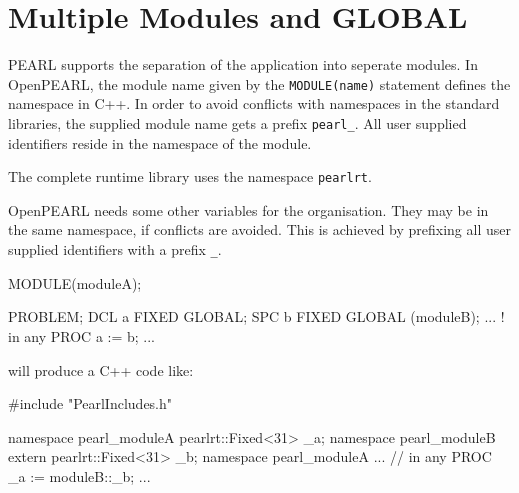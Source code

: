 \chapter{Multiple Modules and GLOBAL}

PEARL supports the separation of the application into seperate modules.
In OpenPEARL, the module name given by the \texttt{MODULE(name)} statement
defines the namespace in C++.
In order to avoid conflicts with namespaces in the standard libraries,
the supplied module name gets a prefix \texttt{pearl\_}.
All user supplied identifiers reside in the namespace of the module.

The complete runtime library uses the namespace \texttt{pearlrt}.

OpenPEARL needs some other variables for the organisation. 
They may be in the same namespace, if conflicts are avoided. This is 
achieved by prefixing all user supplied identifiers with a prefix \texttt{\_}.

\begin{PEARLCode}
MODULE(moduleA);

PROBLEM;
   DCL  a FIXED GLOBAL;
   SPC b FIXED GLOBAL (moduleB);
...
! in any PROC
   a := b;
...
\end{PEARLCode}

will produce a C++ code like:
\begin{CppCode}
#include "PearlIncludes.h"

namespace pearl_moduleA {
   pearlrt::Fixed<31> _a;
}
namespace pearl_moduleB {
   extern pearlrt::Fixed<31> _b;
}
namespace pearl_moduleA {
...
// in any PROC
   _a := moduleB::_b;
...
}
\end{CppCode}



